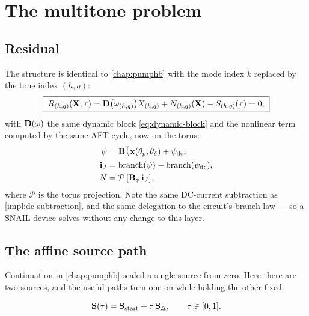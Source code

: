 \section{The multitone problem}

\subsection{Residual}

The structure is identical to \cref{chap:pumphb} with the mode index $k$
replaced by the tone index $(h,q)$:
\begin{equation}
  \boxed{\;
  R_{(h,q)}(\mathbf{X};\tau)
  = \mathbf{D}\bigl(\omega_{(h,q)}\bigr)X_{(h,q)}
  + N_{(h,q)}(\mathbf{X})
  - S_{(h,q)}(\tau) = 0,
  \;}
\end{equation}
with $\mathbf{D}(\omega)$ the same dynamic block \eqref{eq:dynamic-block} and the
nonlinear term computed by the same AFT cycle, now on the torus:
\begin{align}
  \psi &= \mathbf{B}_{\phi}^{\mathsf T}\mathbf{x}(\theta_p,\theta_\delta) + \psi_{\mathrm{dc}},\\
  \mathbf{i}_{J}  &= \text{branch}(\psi) - \text{branch}(\psi_{\mathrm{dc}}),\\
  N &= \mathcal{P}\left[\mathbf{B}_{\phi}\,\mathbf{i}_{J}\right],
\end{align}
where $\mathcal{P}$ is the torus projection. Note the same DC-current
subtraction as \cref{impl:dc-subtraction}, and the same delegation to the
circuit's branch law --- so a SNAIL device solves without any change to this
layer.

\subsection{The affine source path}

Continuation in \cref{chap:pumphb} scaled a single source from zero. Here there
are two sources, and the useful paths turn one on while holding the other fixed.

\begin{definition}
\begin{equation}
  \mathbf{S}(\tau) = \mathbf{S}_{\mathrm{start}} + \tau\,\mathbf{S}_{\Delta},
  \qquad \tau\in[0,1].
\end{equation}
\end{definition}

